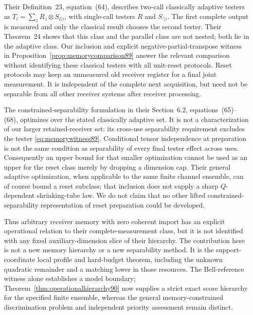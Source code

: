 Their Definition~23, equation~(64), describes two-call classically
adaptive testers as $T_i=\sum_zR_z\otimes S_{i|z}$, with single-call
testers $R$ and $S_{\cdot|z}$.  The first complete output is measured
and only the classical result chooses the second tester.  Their
Theorem~24 shows that this class and the parallel class are not
nested; both lie in the adaptive class.  Our inclusion and explicit
negative-partial-transpose witness in
Proposition~\ref{prop:memorycomparison89} answer the relevant
comparison without identifying these classical testers with all
unit-reset protocols.  Reset protocols may keep an unmeasured old
receiver register for a final joint measurement.  It is independent
of the complete next acquisition, but need not be separable from
all other receiver systems after receiver processing.

The constrained-separability formulation in their Section~6.2,
equations~(65)--(68), optimizes over the stated classically adaptive
set.  It is not a characterization of our larger retained-receiver
set: its cross-use separability requirement excludes the tester
\eqref{eq:memorywitness89}.  Conditional tensor independence at
preparation is not the same condition as separability of every
final tester effect across uses.  Consequently an upper bound for
that smaller optimization cannot be used as an upper for the reset
class merely by dropping a dimension cap.  Their general adaptive
optimization, when applicable to the same finite channel ensemble,
can of course bound a reset subclass; that inclusion does not
supply a sharp $Q$-dependent shrinking-tube law.  We do not claim
that no other lifted constrained-separability representation of
reset preparation could be developed.

Thus arbitrary receiver memory with zero coherent import has an
explicit operational relation to their complete-measurement
class, but it is not identified with any fixed auxiliary-dimension
slice of their hierarchy.  The contribution here is not a new
memory hierarchy or a new separability method.  It is the
support-coordinate local profile and hard-budget theorem, including
the unknown quadratic remainder and a matching lower in those
resources.  The Bell-reference witness alone establishes a model
boundary; Theorem~\ref{thm:operationalhierarchy90} now supplies a strict
exact score hierarchy for the specified finite ensemble, whereas the general memory-constrained discrimination
problem and independent priority assessment remain distinct.

